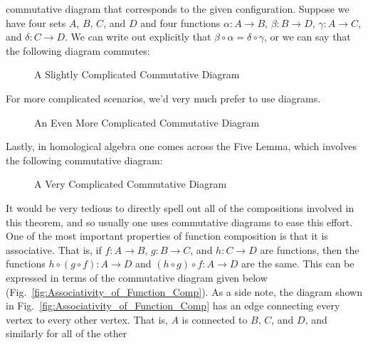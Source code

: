         commutative diagram that corresponds to the given configuration.
        Suppose we have four sets $A$, $B$, $C$, and $D$ and four functions
        $\alpha:A\rightarrow{B}$, $\beta:B\rightarrow{D}$,
        $\gamma:A\rightarrow{C}$, and $\delta:C\rightarrow{D}$. We can write out
        explicitly that $\beta\circ\alpha=\delta\circ\gamma$, or we can say that
        the following diagram commutes:
        \begin{figure}[H]
            \centering
            \captionsetup{type=figure}
            
            \caption{A Slightly Complicated Commutative Diagram}
            \label{fig:Commutative_Diagram_Func_Comp_001}
        \end{figure}
        For more complicated scenarios, we'd very much prefer to use diagrams.
        \begin{figure}[H]
            \centering
            \captionsetup{type=figure}
            
            \caption{An Even More Complicated Commutative Diagram}
            \label{fig:Commutative_Diagram_Func_Comp_002}
        \end{figure}
        Lastly, in homological algebra one comes
        across the Five Lemma, which involves the
        following commutative diagram:
        \begin{figure}[H]
            \centering
            \captionsetup{type=figure}
            
            \caption{A Very Complicated Commutative Diagram}
            \label{fig:Commutative_Diagram_Func_Comp_003}
        \end{figure}
        It would be very tedious to directly spell out all of the compositions
        involved in this theorem, and so usually one uses commutative diagrams
        to ease this effort. One of the most important properties of function
        composition is that it is associative. That is, if $f:A\rightarrow{B}$,
        $g:B\rightarrow{C}$, and $h:C\rightarrow{D}$ are functions, then the
        functions $h\circ(g\circ{f}):A\rightarrow{D}$ and
        $(h\circ{g})\circ{f}:A\rightarrow{D}$ are the same. This can be
        expressed in terms of the commutative diagram given below
        (Fig.~\ref{fig:Associativity_of_Function_Comp}). As a side note, the
        diagram shown in Fig.~\ref{fig:Associativity_of_Function_Comp} has an
        edge connecting every vertex to every other vertex. That is, $A$ is
        connected to $B$, $C$, and $D$, and similarly for all of the other
